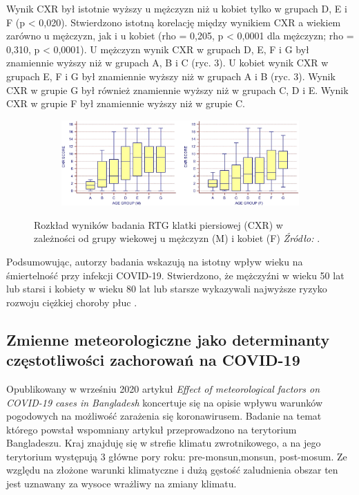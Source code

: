 \documentclass[polish, twoside, 12pt, a4paper]{article}
\theoremstyle{definition}
\theoremstyle{plain}
\theoremstyle{remark}
\begin{document}
Wynik CXR był istotnie wyższy u mężczyzn niż u kobiet tylko w grupach D, E i F (p < 0,020). Stwierdzono istotną korelację między wynikiem CXR a wiekiem zarówno u mężczyzn, jak i u kobiet (rho = 0,205, p < 0,0001 dla mężczyzn; rho = 0,310, p < 0,0001). U mężczyzn wynik CXR w grupach D, E, F i G był znamiennie wyższy niż w grupach A, B i C (ryc. 3). U kobiet wynik CXR w grupach E, F i G był znamiennie wyższy niż w grupach A i B (ryc. 3). Wynik CXR w grupie G był również znamiennie wyższy niż w grupach C, D i E. Wynik CXR w grupie F był znamiennie wyższy niż w grupie C.


\begin{figure}[hbt]
  \centering

  \begin{subfigure}[t]{\textwidth}
    \includegraphics[width=15cm]{age-sex.jpg}
  \end{subfigure}

  \captionsetup{margin=10pt,font=small,labelfont=bf,width=.8\textwidth}

  \caption{Rozkład wyników badania RTG klatki piersiowej (CXR) w zależności od grupy wiekowej u mężczyzn (M) i kobiet (F) \textit{Źródło:} \cite{wang2020}.}\label{fig:xxx2}
\end{figure}

Podsumowując, autorzy badania wskazują na istotny wpływ wieku na śmiertelność przy infekcji COVID-19. Stwierdzono, że mężczyźni w wieku 50 lat lub starsi i kobiety w wieku 80 lat lub starsze wykazywali najwyższe ryzyko rozwoju ciężkiej choroby płuc \cite{wang2020}.

\subsection{Zmienne meteorologiczne jako determinanty częstotliwości zachorowań na COVID-19}


Opublikowany w wrześniu 2020 artykuł \emph{Effect of meteorological factors on COVID-19 cases in Bangladesh} koncertuje się na opisie wpływu warunków pogodowych na możliwość zarażenia się koronawirusem. Badanie na temat którego powstał wspomniany artykuł przeprowadzono na terytorium Bangladeszu. Kraj znajduję się w strefie klimatu zwrotnikowego, a na jego terytorium występują 3 główne pory roku: pre-monsun,monsun, post-mosum. Ze względu na złożone warunki klimatyczne i dużą gęstość zaludnienia obszar ten jest uznawany za wysoce wrażliwy na zmiany klimatu.
\end{document}
